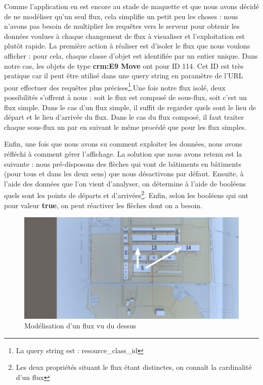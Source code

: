 Comme l'application en est encore au stade de maquette et que nous avons décidé de ne modéliser qu'un seul flux, cela simplifie un petit peu les choses : nous n'avons pas besoin de multiplier les requêtes vers le serveur pour obtenir les données voulues à chaque changement de flux à visualiser et l'exploitation est plutôt rapide. La première action à réaliser est d'isoler le flux que nous voulons afficher : pour cela, chaque classe d'objet est identifiée par un entier unique. Dans notre cas, les objets de type \textbf{crm:E9 Move} ont pour ID 114. Cet ID est très pratique car il peut être utilisé dans une query string en paramètre de l'URL pour effectuer des requêtes plus précises\footnote{La query string est : resource\_class\_id}.Une fois notre flux isolé, deux possibilités s'offrent à nous : soit le flux est composé de sous-flux, soit c'est un flux simple. Dans le cas d'un flux simple, il suffit de regarder quels sont le lieu de départ et le lieu d'arrivée du flux. Dans le cas du flux composé, il faut traiter chaque sous-flux un par en suivant le même procédé que pour les flux simples.

Enfin, une fois que nous avons su comment exploiter les données, nous avons réfléchi à comment gérer l'affichage. La solution que nous avons retenu est la suivante : nous pré-disposons des flèches qui vont de bâtiments en bâtiments (pour tous et dans les deux sens) que nous désactivons par défaut. Ensuite, à l'aide des données que l'on vient d'analyser, on détermine à l'aide de booléens quels sont les points de départs et d'arrivées\footnote{Les deux propriétés situant le flux étant distinctes, on connaît la cardinalité d'un flux}. Enfin, selon les booléens qui ont pour valeur \textbf{true}, on peut réactiver les flèches dont on a besoin.

\begin{figure} [H]
    \centering
    \includegraphics[width=1\textwidth]{assets/unity/screen_unity_flux.png}
    \caption{Modélisation d'un flux vu du dessus}
    \label{fig:unityFlux}
\end{figure}

